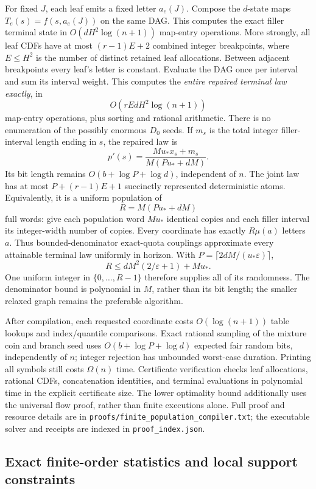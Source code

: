 \documentclass[11pt]{article}
\begin{document}
For fixed $J$, each leaf emits a fixed letter $a_e(J)$. Compose the $d$-state maps $T_e(s)=f(s,a_e(J))$ on the same DAG. This computes the exact filler terminal state in $O(dH^2\log(n+1))$ map-entry operations. More strongly, all leaf CDFs have at most $(r-1)E+2$ combined integer breakpoints, where $E\le H^2$ is the number of distinct retained leaf allocations. Between adjacent breakpoints every leaf's letter is constant. Evaluate the DAG once per interval and sum its interval weight. This computes the \emph{entire repaired terminal law exactly}, in
\[
O(rEdH^2\log(n+1))
\]
map-entry operations, plus sorting and rational arithmetic. There is no enumeration of the possibly enormous $D_0$ seeds. If $m_s$ is the total integer filler-interval length ending in $s$, the repaired law is
\[
p'(s)=\frac{M u_*x_s+m_s}{M(Pu_*+dM)}.
\tag{C7}
\]
Its bit length remains $O(b+\log P+\log d)$, independent of $n$. The joint law has at most $P+(r-1)E+1$ succinctly represented deterministic atoms. Equivalently, it is a uniform population of
\[
R=M(Pu_*+dM)
\]
full words: give each population word $Mu_*$ identical copies and each filler interval its integer-width number of copies. Every coordinate has exactly $R\mu(a)$ letters $a$. Thus bounded-denominator exact-quota couplings approximate every attainable terminal law uniformly in horizon. With $P=\lceil2dM/(u_*\varepsilon)\rceil$,
\[
R\le dM^2(2/\varepsilon+1)+Mu_*.
\]
One uniform integer in $\{0,\ldots,R-1\}$ therefore supplies all of its randomness. The denominator bound is polynomial in $M$, rather than its bit length; the smaller relaxed graph remains the preferable algorithm.

After compilation, each requested coordinate costs $O(\log(n+1))$ table lookups and index/quantile comparisons. Exact rational sampling of the mixture coin and branch seed uses $O(b+\log P+\log d)$ expected fair random bits, independently of $n$; integer rejection has unbounded worst-case duration. Printing all symbols still costs $\Omega(n)$ time. Certificate verification checks leaf allocations, rational CDFs, concatenation identities, and terminal evaluations in polynomial time in the explicit certificate size. The lower optimality bound additionally uses the universal flow proof, rather than finite executions alone. Full proof and resource details are in \texttt{proofs/finite\_population\_compiler.txt}; the executable solver and receipts are indexed in \texttt{proof\_index.json}.

\subsection{Exact finite-order statistics and local support constraints}\label{sec:blocks}
\end{document}
